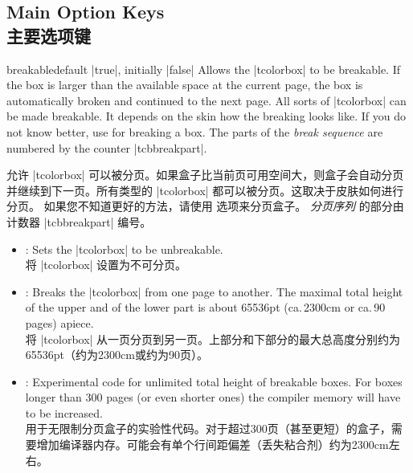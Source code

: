 
\subsection{Main Option Keys\\主要选项键}
\begin{docTcbKey}[][doc updated=2017-02-01]{breakable}{}{default |true|, initially |false|}
Allows the |tcolorbox| to be breakable. If the box is larger than the
available space at the current page, the box is automatically broken
and continued to the next page. All sorts of |tcolorbox| can be made
breakable. It depends on the skin how the breaking looks like.
If you do not know better, use  for breaking a box.
The parts of the \emph{break sequence} are numbered
by the counter |tcbbreakpart|.

允许 |tcolorbox| 可以被分页。如果盒子比当前页可用空间大，则盒子会自动分页并继续到下一页。所有类型的 |tcolorbox| 都可以被分页。这取决于皮肤如何进行分页。 如果您不知道更好的方法，请使用  选项来分页盒子。 \emph{分页序列} 的部分由计数器 |tcbbreakpart| 编号。
\begin{itemize}
\item{}: Sets the |tcolorbox| to be unbreakable.
\\将 |tcolorbox| 设置为不可分页。
\item{}: Breaks the |tcolorbox| from one page to another.
The maximal total height of the upper and of the lower part is
about 65536pt (ca.\,2300cm or ca.\,90 pages) apiece.
\\将 |tcolorbox| 从一页分页到另一页。上部分和下部分的最大总高度分别约为65536pt（约为2300cm或约为90页）。
\item{}: Experimental code for unlimited total height of
breakable boxes.
For boxes longer than 300 pages (or even shorter ones) the
compiler memory will have to be increased.
\\用于无限制分页盒子的实验性代码。对于超过300页（甚至更短）的盒子，需要增加编译器内存。可能会有单个行间距偏差（丢失粘合剂）约为2300cm左右。
\end{itemize}

\begin{dispListing}

\begin{tcolorbox}[breakable,title=My breakable box]
\lipsum[1-6]
\end{tcolorbox}
\end{dispListing}
\end{docTcbKey}
{\tcbusetemp}


